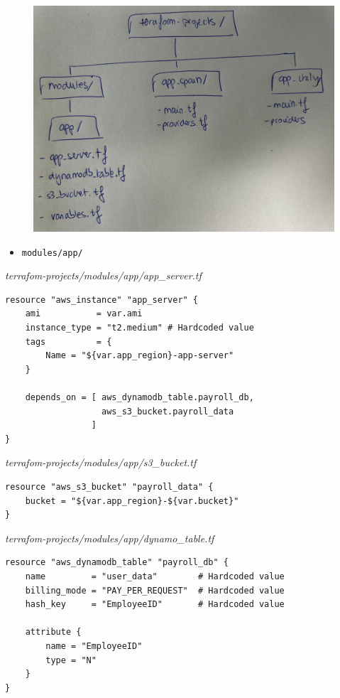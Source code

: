 \documentclass{article}
\newenvironment{codetemplate}[1][]{%
  \mybasecolorbox[#1]
  \itshape
}{%
  \endmybasecolorbox
}
\begin{document}
\begin{figure}[H]
    \includegraphics[width=\textwidth]{pictures/pic13.jpeg}
    \centering
\end{figure}

\begin{itemize}
    \item \verb|modules/app/|
\end{itemize}

\begin{codetemplate}{terrafom-projects/modules/app/app\_server.tf}
\begin{verbatim}
resource "aws_instance" "app_server" {
    ami           = var.ami
    instance_type = "t2.medium" # Hardcoded value
    tags          = {
        Name = "${var.app_region}-app-server"
    }
    
    depends_on = [ aws_dynamodb_table.payroll_db,
                   aws_s3_bucket.payroll_data   
                 ]
}
\end{verbatim}
\end{codetemplate}

\begin{codetemplate}{terrafom-projects/modules/app/s3\_bucket.tf}
\begin{verbatim}
resource "aws_s3_bucket" "payroll_data" {
    bucket = "${var.app_region}-${var.bucket}"
}
\end{verbatim}
\end{codetemplate}
\begin{codetemplate}{terrafom-projects/modules/app/dynamo\_table.tf}
\begin{verbatim}
resource "aws_dynamodb_table" "payroll_db" {
    name         = "user_data"        # Hardcoded value
    billing_mode = "PAY_PER_REQUEST"  # Hardcoded value
    hash_key     = "EmployeeID"       # Hardcoded value

    attribute {
        name = "EmployeeID"
        type = "N"
    }
}
\end{verbatim}
\end{codetemplate}
\end{document}
